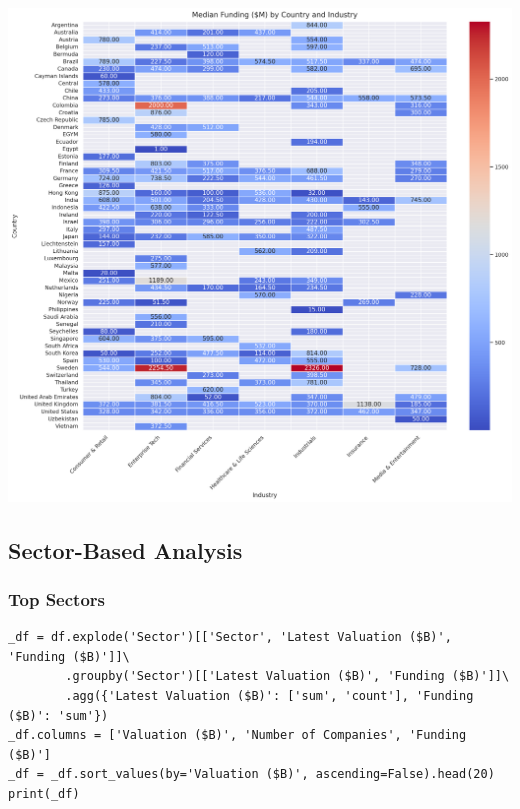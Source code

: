 \documentclass[a4paper,12pt]{article}
\begin{document}
\begin{center}
\includegraphics[width=.9\linewidth]{./.ob-jupyter/1fae544818601e487320f474cee01e7e7688ed42.png}
\label{}
\end{center}
\subsection{Sector-Based Analysis}
\label{sec:orgab5b985}
\subsubsection{Top Sectors}
\label{sec:org1f9cd60}
\begin{verbatim}
_df = df.explode('Sector')[['Sector', 'Latest Valuation ($B)', 'Funding ($B)']]\
        .groupby('Sector')[['Latest Valuation ($B)', 'Funding ($B)']]\
        .agg({'Latest Valuation ($B)': ['sum', 'count'], 'Funding ($B)': 'sum'})
_df.columns = ['Valuation ($B)', 'Number of Companies', 'Funding ($B)']
_df = _df.sort_values(by='Valuation ($B)', ascending=False).head(20)
print(_df)
\end{verbatim}
\end{document}
